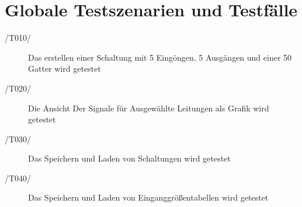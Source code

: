 
\section{Globale Testszenarien und Testfälle}


\begin{description}
	\item[/T010/] Das erstellen einer Schaltung mit 5 Eingöngen, 5 Ausgängen und einer 50 Gatter wird getestet
	\item[/T020/] Die Ansicht Der Signale für Ausgewählte Leitungen als Grafik wird getestet
	\item[/T030/] Das Speichern und Laden von Schaltungen wird getestet
	\item[/T040/] Das Speichern und Laden von Einganggrößentabellen wird getestet
\end{description}